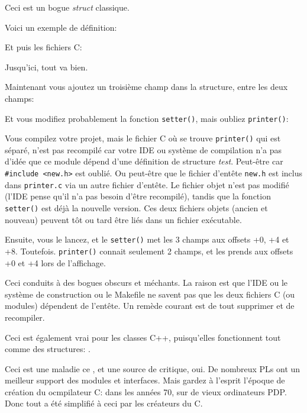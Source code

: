 
Ceci est un bogue \emph{struct} classique.

Voici un exemple de définition:



Et puis les fichiers C:





Jusqu'ici, tout va bien.

Maintenant vous ajoutez un troisième champ dans la structure, entre les deux champs:



Et vous modifiez probablement la fonction \verb|setter()|, mais oubliez \verb|printer()|:



Vous compilez votre projet, mais le fichier C où se trouve \verb|printer()| qui
est séparé, n'est pas recompilé car votre \ac{IDE} ou système de compilation n'a
pas d'idée que ce module dépend d'une définition de structure \emph{test}.
Peut-être car \verb|#include <new.h>| est oublié.
Ou peut-être que le fichier d'entête \verb|new.h| est inclus dans \verb|printer.c|
via un autre fichier d'entête.
Le fichier objet n'est pas modifié (l'\ac{IDE} pense qu'il n'a pas besoin d'être
recompilé), tandis que la fonction \verb|setter()| est déjà la nouvelle version.
Ces deux fichiers objets (ancien et nouveau) peuvent tôt ou tard être liés dans un
fichier exécutable.

Ensuite, vous le lancez, et le \verb|setter()| met les 3 champs aux offsets +0,
+4 et +8.
Toutefois. \verb|printer()| connait seulement 2 champs, et les prends aux offsets
+0 et +4 lors de l'affichage.

Ceci conduits à des bogues obscurs et méchants.
La raison est que l'\ac{IDE} ou le système de construction ou le Makefile ne savent
pas que les deux fichiers C (ou modules) dépendent de l'entête.
Un remède courant est de tout supprimer et de recompiler.

Ceci est également vrai pour les classes C++, puisqu'elles fonctionnent tout comme
des structures: .

Ceci est une maladie ce \CCpp, et une source de critique, oui.
De nombreux \ac{PL}s ont un meilleur support des modules et interfaces.
Mais gardez à l'esprit l'époque de création du ocmpilateur C: dans les années 70,
sur de vieux ordinateurs PDP.
Donc tout a été simplifié à ceci par les créateurs du C.
